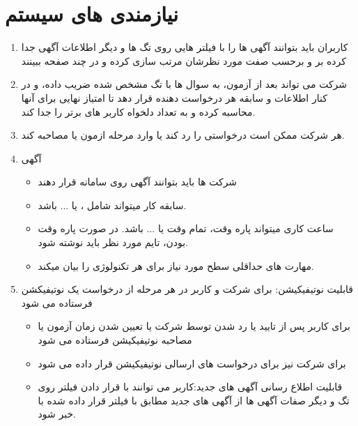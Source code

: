 \documentclass{article}
\begin{document}
\section{نیازمندی های سیستم}
    \begin{enumerate}[\hspace{1cm}1.]
        \item کاربران باید بتوانند آگهی ها را با فیلتر هایی روی تگ ها و دیگر اطلاعات آگهی جدا کرده بر و برحسب صفت مورد نظرشان مرتب سازی کرده و در چند صفحه ببینند
        
        \item شرکت می تواند بعد از آزمون، به سوال ها با تگ مشخص شده ضریب داده، و در کنار اطلاعات و سابقه هر درخواست دهنده قرار دهد تا امتیاز نهایی برای آنها محاسبه کرده و به تعداد دلخواه کاربر های برتر را جدا کند.
        \item هر شرکت ممکن است درخواستی را رد کند یا وارد مرحله ازمون یا مصاحبه کند.
        
        \item آگهی
        \begin{itemize}
            \item شرکت ها باید بتوانند آگهی روی سامانه قرار دهند 
            \item سابقه کار میتواند شامل ،  یا ... باشد.
            \item ساعت کاری میتواند پاره وقت، تمام وقت یا ... باشد. در صورت پاره وقت بودن، تایم مورد نظر باید نوشته شود.
            \item مهارت های حداقلی سطح مورد نیاز برای هر تکنولوژی را بیان میکند.
        \end{itemize}

        \item قابلیت نوتیفیکیشن: برای شرکت و کاربر در هر مرحله از درخواست یک نوتیفیکشن فرستاده می شود
        \begin{itemize}
            \item برای کاربر پس از تایید یا رد شدن توسط شرکت یا تعیین شدن زمان آزمون یا مصاحبه نوتیفیکیشن فرستاده می شود
            \item برای شرکت نیز برای درخواست های ارسالی نوتیفیکیشن قرار داده می شود
            \item قابلیت اطلاع رسانی آگهی های جدید:کاربر می توانند با قرار دادن فیلتر روی تگ و دیگر صفات آگهی ها
            از آگهی های جدید مطابق با فیلتر قرار داده شده با خبر شود.
        \end{itemize}

        \pagebreak


\end{enumerate}
\end{document}
